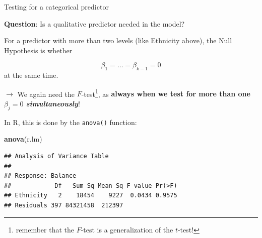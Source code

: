 \documentclass[
  10pt,
  ignorenonframetext,
]{beamer}
\newenvironment{Shaded}{\begin{snugshade}}{\end{snugshade}}
\newcommand{\FunctionTok}[1]{\textcolor[rgb]{0.13,0.29,0.53}{\textbf{#1}}}
\newcommand{\NormalTok}[1]{#1}
\begin{document}
\begin{frame}[fragile]
\begin{block}{Testing for a categorical predictor}
\protect\hypertarget{testing-for-a-categorical-predictor}{}
\vspace{2mm}

\textbf{Question}: Is a qualitative predictor needed in the model?

\vspace{2mm}

For a predictor with more than two levels (like Ethnicity above), the
Null Hypothesis is whether

\[\beta_1 = \ldots = \beta_{k-1}=0\] at the same time.

\vspace{2mm}

\(\rightarrow\) We again need the
\(F\)-test\footnote{remember that the $F$-test is a generalization of the $t$-test!},
as \textbf{always when we test for more than one \(\beta_j=0\)
\emph{simultaneously}}!

\vspace{2mm}

In R, this is done by the \texttt{anova()} function:

\vspace{2mm}

\scriptsize

\begin{Shaded}
\begin{Highlighting}[]
\FunctionTok{anova}\NormalTok{(r.lm)}
\end{Highlighting}
\end{Shaded}

\begin{verbatim}
## Analysis of Variance Table
## 
## Response: Balance
##            Df   Sum Sq Mean Sq F value Pr(>F)
## Ethnicity   2    18454    9227  0.0434 0.9575
## Residuals 397 84321458  212397
\end{verbatim}
\end{block}
\end{frame}
\end{document}

